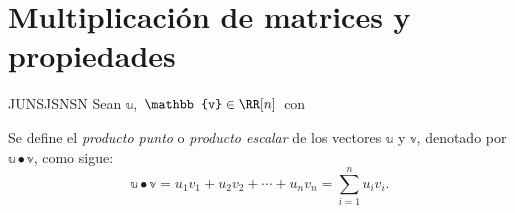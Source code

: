 \section{Multiplicación de matrices y propiedades}

\begin{definicion}{}{JUNSJSNSN}
    Sean $\mathbb{u}$, $\mathbb{v} \in \RR[n]$ con
    \begin{matrizn}
    \end{matrizn}
    Se define el \emph{producto punto} o \emph{producto escalar} de los vectores $\mathbb{u}$ y $\mathbb{v}$, denotado por $\mathbb{u} \bullet \mathbb{v}$, como sigue:
    $$\mathbb{u} \bullet \mathbb{v} = u_1v_1 + u_2v_2 + \cdots + u_nv_n = \sum_{i=1}^{n} u_iv_i.$$
\end{definicion}

